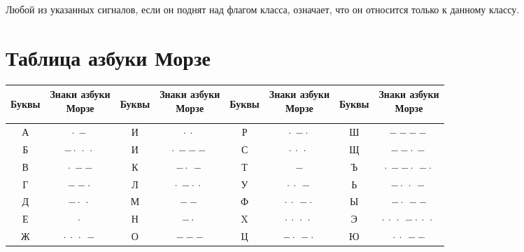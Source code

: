 \documentclass[a4paper, 12pt, twoside, final]{scrbook}
\begin{document}
Любой из указанных сигналов, если он поднят над   флагом класса, означает, что он относится только к данному классу.

\section{Таблица азбуки  Морзе}
\label{app:6}

\begin{longtable}{cccccccc}
	\toprule
	\begin{sideways}Буквы\end{sideways} & \shortstack[c]{Знаки азбуки\\Морзе} & \begin{sideways}Буквы\end{sideways} & \shortstack[c]{Знаки азбуки\\Морзе} & \begin{sideways}Буквы\end{sideways} & \shortstack[c]{Знаки азбуки\\Морзе} & \begin{sideways}Буквы\end{sideways} & \shortstack[c]{Знаки азбуки\\Морзе} \\
	\midrule
	А & \Large $\cdot\  -$ & И & \Large $\cdot\  \cdot\ $ & Р & \Large $\cdot\  - \cdot\ $ & Ш  & \Large $- - - -$ \\
	\midrule
	Б & \Large $- \cdot\  \cdot\  \cdot\ $ & И & \Large $\cdot\  - - -$  & С & \Large $\cdot\  \cdot\  \cdot\ $ & Щ & \Large $- - \cdot\  -$ \\
	\midrule
	В & \Large $\cdot\  - -$ & К & \Large $- \cdot\  -$ & Т & \Large $-$ & Ъ & \Large $\cdot\  - - \cdot\  - \cdot\ $ \\
	\midrule
	Г & \Large $- - \cdot\ $ & Л & \Large $\cdot\  - \cdot\  \cdot\ $ & У & \Large $\cdot\  \cdot\  -$ & Ь & \Large $- \cdot\  \cdot\  -$ \\
	\midrule
	Д & \Large $- \cdot\  \cdot\ $ & М & \Large $- -$ & Ф & \Large $\cdot\  \cdot\  - \cdot\ $ & Ы & \Large $- \cdot\  - -$ \\
	\midrule
	Е & \Large $\cdot\ $ & Н & \Large $- \cdot\ $ & X & \Large $\cdot\  \cdot\  \cdot\  \cdot\ $ & Э & \Large $\cdot\  \cdot\  \cdot\  - \cdot\  \cdot\  \cdot\ $ \\
	\midrule
	Ж & \Large $\cdot\  \cdot\  \cdot\  -$ & О & \Large $- - -$ & Ц & \Large $- \cdot\  - \cdot\ $ & Ю & \Large $ \cdot\  \cdot\  - -$ \\
	\midrule

\end{longtable}
\end{document}
